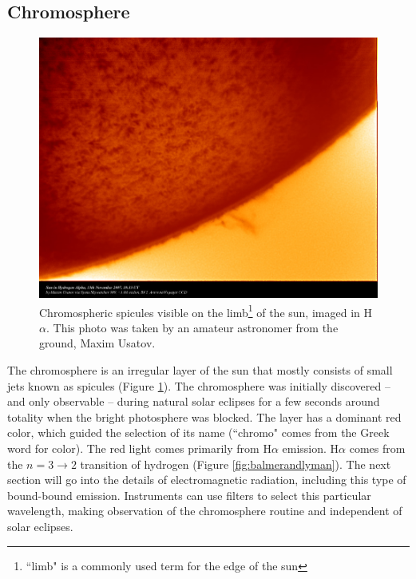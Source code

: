 \subsection{Chromosphere}

\begin{figure}[!h]
    \begin{center}
	    \includegraphics[width=120mm]{Images/Spicules.png}
    \end{center}
    \caption[Spicules of the chromosphere]{
        Chromospheric spicules visible on the limb\footnote{``limb" is a commonly used term for the edge
        of the sun} of the sun, imaged in H$\alpha$. This photo was taken by an amateur astronomer from the ground, 
        Maxim Usatov. 
    }
    \label{fig:spicules}
\end{figure}

The chromosphere is an irregular layer of the sun that mostly consists of small jets known as spicules (Figure \ref{fig:spicules}). The chromosphere was initially discovered -- and only observable -- during natural solar eclipses for a few seconds around totality when the bright photosphere was blocked. The layer has a dominant red color, which guided the selection of its name (``chromo" comes from the Greek word for color). The red light comes primarily from H$\alpha$ emission. H$\alpha$ comes from the $n = 3\rightarrow 2$ transition of hydrogen (Figure \ref{fig:balmerandlyman}). The next section will go into the details of electromagnetic radiation, including this type of bound-bound emission. Instruments can use filters to select this particular wavelength, making observation of the chromosphere routine and independent of solar eclipses. 

